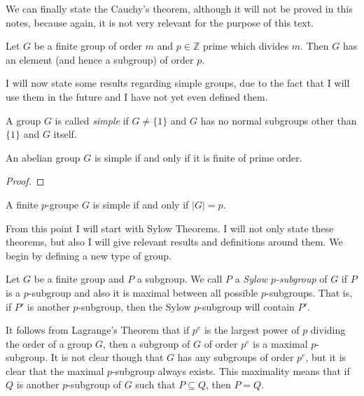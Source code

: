\documentclass[../main.tex]{subfiles}
\begin{document}
We can finally state the Cauchy's theorem, although it will not be proved in this notes, because again, it is not very relevant for the purpose of this text.

\begin{ter}
[Cauchy] Let $G$ be a finite group of order $m$ and $p\in\mathbb{Z}$ prime which divides $m$. Then $G$ has an element (and hence a subgroup) of order $p$.
\end{ter}

I will now state some results regarding simple groups, due to the fact that I will use them in the future and I have not yet even defined them.

\begin{defi}
 A group $G$ is called \textit{simple} if $G\not=\{1\}$ and $G$ has no normal subgroups other than $\{1\}$ and $G$ itself.
\end{defi}

\begin{prop}
An abelian group $G$ is simple if and only if it is finite of prime order.
\end{prop}
\begin{proof}
\noproof
\end{proof}

\begin{coro}
A finite $p$-groupe $G$ is simple if and only if $|G| = p$.
\end{coro}

From this point I will start with Sylow Theorems. I will not only state these theorems, but also I will give relevant results and definitions around them. We begin by defining a new type of group.

\begin{defi}
 Let $G$ be a finite group and $P$ a subgroup. We call $P$ a \textit{Sylow $p$-subgroup} of $G$ if $P$ is a $p$-subgroup and also it is maximal between all possible $p$-subgroups. That is, if $P'$ is another $p$-subgroup, then the Sylow $p$-subgroup will contain $P'$.
\end{defi}


It follows from Lagrange's Theorem that if $p^{e}$ is the largest power of $p$ dividing the order of a group $G$, then a subgroup of $G$ of order $p^{e}$ is a maximal $p$-subgroup. It is not clear though that $G$ has any subgroups of order $p^{e}$, but it is clear that the maximal $p$-subgroup always exists. This maximality means that if $Q$ is another $p$-subgroup of $G$ such that $P\subseteq Q$, then $P=Q$.
\end{document}
